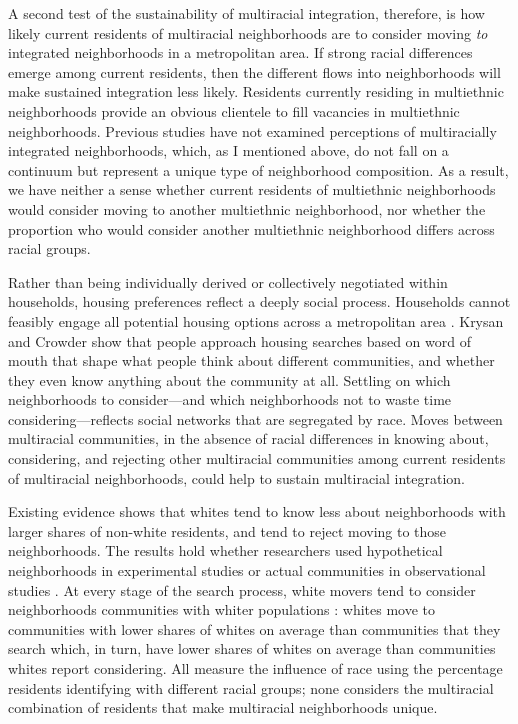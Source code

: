\documentclass{baderart}
\begin{document}
A second test of the sustainability of multiracial integration, therefore, is how likely current residents of multiracial neighborhoods are to consider moving \emph{to} integrated neighborhoods in a metropolitan area. If strong racial differences emerge among current residents, then the different flows into neighborhoods will make sustained integration less likely. Residents currently residing in multiethnic neighborhoods provide an obvious clientele to fill vacancies in multiethnic neighborhoods. Previous studies have not examined perceptions of multiracially integrated neighborhoods, which, as I mentioned above, do not fall on a continuum but represent a unique type of neighborhood composition. As a result, we have neither a sense whether current residents of multiethnic neighborhoods would consider moving to another multiethnic neighborhood, nor whether the proportion who would consider another multiethnic neighborhood differs across racial groups.

Rather than being individually derived or collectively negotiated within households, housing preferences reflect a deeply social process. Households cannot feasibly engage all potential housing options across a metropolitan area \citep{brown_intra-urban_1970, maclennan_housing_1982, marsh_uncertainty_2011}. Krysan and Crowder \citeyearpar{krysan_cycle_2017} show that people approach housing searches based on word of mouth that shape what people think about different communities, and whether they even know anything about the community at all. Settling on which neighborhoods to consider---and which neighborhoods not to waste time considering---reflects social networks that are segregated by race.  Moves between multiracial communities, in the absence of racial differences in knowing about, considering, and rejecting other multiracial communities among current residents of multiracial neighborhoods, could help to sustain multiracial integration. 

Existing evidence shows that whites tend to know less about neighborhoods with larger shares of non-white residents, and tend to reject moving to those neighborhoods. The results hold whether researchers used hypothetical neighborhoods in experimental studies or actual communities in observational studies \citep{krysan_perceiving_2007, krysan_does_2009, lewis_who_2011, bader_community_2015}. At every stage of the search process, white movers tend to consider neighborhoods communities with whiter populations \citep{havekes_realizing_2016}: whites move to communities with lower shares of whites on average than communities that they search which, in turn, have lower shares of whites on average than communities whites report considering. All measure the influence of race using the percentage residents identifying with different racial groups; none considers the multiracial combination of residents that make multiracial neighborhoods unique.
\end{document}
